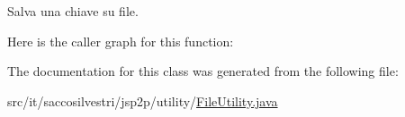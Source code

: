 \-Salva una chiave su file. 



\-Here is the caller graph for this function\-:




\-The documentation for this class was generated from the following file\-:\begin{DoxyCompactItemize}
\item 
src/it/saccosilvestri/jsp2p/utility/\hyperlink{_file_utility_8java}{\-File\-Utility.\-java}\end{DoxyCompactItemize}
